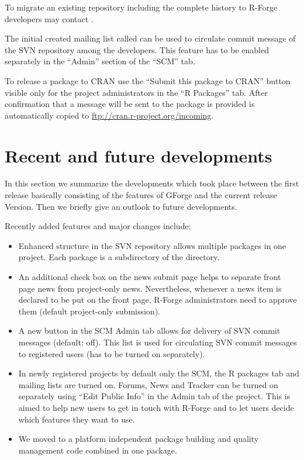 To migrate an existing repository including the complete history to
R-Forge developers may contact .

The initial created mailing list called
 can be used to
circulate commit message of the SVN repository among the
developers. This feature has to be enabled separately in the ``Admin''
section of the ``SCM'' tab. 

To release a package to CRAN use the
``Submit this package to CRAN'' button visible only for the project
administrators in the ``R Packages'' tab. After confirmation that a
message will be sent to  the package is
provided is automatically copied to
\url{ftp://cran.r-project.org/incoming}.

\section*{Recent and future developments}
In this section we summarize the developments which took place between
the first release basically consisting of the features of GForge and
the current release Version. Then we briefly give an outlook to future
developments.

Recently added features and major changes include:
\begin{itemize}
\item Enhanced structure in the SVN repository allows multiple
  packages in one project. Each package is a subdirectory of the
   directory.
\item An additional check box on the news submit page helps to
  separate front page news from project-only news. Nevertheless,
  whenever a news item is declared to be put on the front page,
  R-Forge administrators need to approve them (default project-only
  submission).
\item A new button in the SCM Admin tab allows for delivery of SVN
  commit messages (default: off).  This
  list is used for circulating SVN commit messages to registered
  users (has to be turned on separately).
\item In newly registered projects by default only the SCM, the R
  packages tab and mailing lists are turned on. Forums, News and
  Tracker can be turned on separately using ``Edit Public Info'' in
  the Admin tab of the project. This is aimed to help new users to get
  in touch with R-Forge and to let users decide which features they
  want to use.
\item We moved to a platform independent package building and quality
  management code combined in one \R{} package.
\end{itemize}

